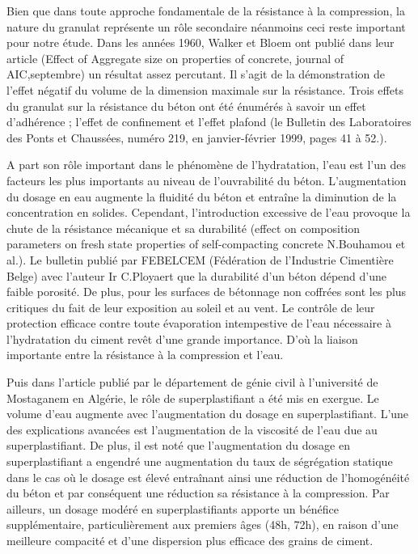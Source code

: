 \documentclass[
  12pt,
]{article}
\begin{document}
Bien que dans toute approche fondamentale de la résistance à la
compression, la nature du granulat représente un rôle secondaire
néanmoins ceci reste important pour notre étude. Dans les années 1960,
Walker et Bloem ont publié dans leur article (Effect of Aggregate size
on properties of concrete, journal of AIC,septembre) un résultat assez
percutant. Il s'agit de la démonstration de l'effet négatif du volume de
la dimension maximale sur la résistance. Trois effets du granulat sur la
résistance du béton ont été énumérés à savoir un effet d'adhérence ;
l'effet de confinement et l'effet plafond (le Bulletin des Laboratoires
des Ponts et Chaussées, numéro 219, en janvier-février 1999, pages 41 à
52.).

A part son rôle important dans le phénomène de l'hydratation, l'eau est
l'un des facteurs les plus importants au niveau de l'ouvrabilité du
béton. L'augmentation du dosage en eau augmente la fluidité du béton et
entraîne la diminution de la concentration en solides. Cependant,
l'introduction excessive de l'eau provoque la chute de la résistance
mécanique et sa durabilité (effect on composition parameters on fresh
state properties of self-compacting concrete N.Bouhamou et al.). Le
bulletin publié par FEBELCEM (Fédération de l'Industrie Cimentière
Belge) avec l'auteur Ir C.Ployaert que la durabilité d'un béton dépend
d'une faible porosité. De plus, pour les surfaces de bétonnage non
coffrées sont les plus critiques du fait de leur exposition au soleil et
au vent. Le contrôle de leur protection efficace contre toute
évaporation intempestive de l'eau nécessaire à l'hydratation du ciment
revêt d'une grande importance. D'où la liaison importante entre la
résistance à la compression et l'eau.

Puis dans l'article publié par le département de génie civil à
l'université de Mostaganem en Algérie, le rôle de superplastifiant a été
mis en exergue. Le volume d'eau augmente avec l'augmentation du dosage
en superplastifiant. L'une des explications avancées est l'augmentation
de la viscosité de l'eau due au superplastifiant. De plus, il est noté
que l'augmentation du dosage en superplastifiant a engendré une
augmentation du taux de ségrégation statique dans le cas où le dosage
est élevé entraînant ainsi une réduction de l'homogénéité du béton et
par conséquent une réduction sa résistance à la compression. Par
ailleurs, un dosage modéré en superplastifiants apporte un bénéfice
supplémentaire, particulièrement aux premiers âges (48h, 72h), en raison
d'une meilleure compacité et d'une dispersion plus efficace des grains
de ciment.
\end{document}
